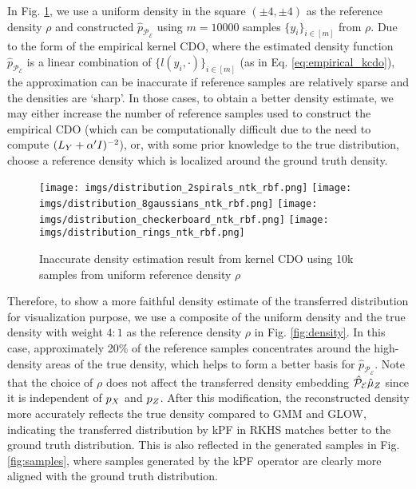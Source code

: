 In Fig. \ref{fig:inaccurate-density}, we use a uniform density in the square $(\pm 4, \pm 4)$ as the reference density $\rho$ and constructed $\hat{p}_{\mathcal{P}_\mathcal{E}}$ using $m = 10000$ samples $\{y_i\}_{i \in [m]}$ from $\rho$. Due to the form of the empirical kernel CDO, where the estimated density function $\hat{p}_{\mathcal{P}_\mathcal{E}}$ is a linear combination of $\{l(y_i, \cdot)\}_{i \in [m]}$ (as in Eq. \ref{eq:empirical_kcdo}), the approximation can be inaccurate if reference samples are relatively sparse and the densities are 
`sharp'. In those cases, to obtain a better density estimate, we may either increase the number of reference samples used to construct the empirical CDO (which can be computationally difficult due to the need to compute $(L_{\var{y}} + \alpha'I)^{-2}$), or, with some prior knowledge to the true distribution, choose a reference density which is localized around the ground truth density.

\begin{figure}[h]
    \centering
    \texttt{[image: imgs/distribution\_2spirals\_ntk\_rbf.png]}
    \texttt{[image: imgs/distribution\_8gaussians\_ntk\_rbf.png]}
    \texttt{[image: imgs/distribution\_checkerboard\_ntk\_rbf.png]}
    \texttt{[image: imgs/distribution\_rings\_ntk\_rbf.png]}
    \caption{Inaccurate density estimation result from kernel CDO using 10k samples from uniform reference density $\rho$}
    \label{fig:inaccurate-density}
\end{figure}

Therefore, to show a more faithful density estimate of the transferred distribution for visualization purpose, we use a composite of the uniform density and the true density with weight $4:1$ as the reference density $\rho$ in Fig. \ref{fig:density}. In this case, approximately 20\% of the reference samples concentrates around the high-density areas of the true density, which helps to form a better basis for $\hat{p}_{\mathcal{P}_\mathcal{E}}$. Note that the choice of $\rho$ does not affect the transferred density embedding $\hat{\mathcal{P}}_\mathcal{E}\hat{\mu}_{\var{z}}$ since it is independent of $p_{\var{x}}$ and $p_{\var{z}}$. After this modification, the reconstructed density more accurately reflects the true density compared to GMM and GLOW, indicating the transferred distribution by kPF in RKHS matches better to the ground truth distribution. This is also reflected in the generated samples in Fig. \ref{fig:samples}, where samples generated by the kPF operator are clearly more aligned with the ground truth distribution.


